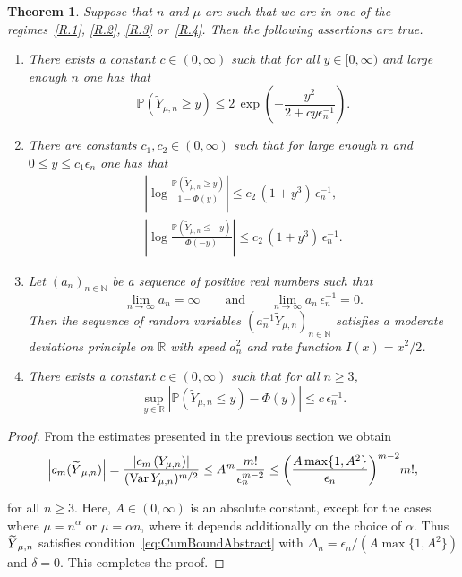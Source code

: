 \documentclass[10pt]{amsart}
\newtheorem{theo}{Theorem}[section]
\theoremstyle{definition}\newtheorem{defi}[theo]{Definition}\newtheorem{rema}[theo]{Remark}\newtheorem{exam}[theo]{Example}\newtheorem{exem}[theo]{Example}\newtheorem{nota}[theo]{Notation}
\newcommand{\R}{\mathbb{R}}
\newcommand{\N}{\mathbb{N}}
\newcommand{\PP}{\mathbb{P}}
\newcommand{\Var}{\mathop{\mathrm{Var}}\nolimits}
\newcommand*{\romanenumi}{\renewcommand*{\theenumi}{\roman{enumi}}}
\let\oldtilde\tilde
\renewcommand*{\tilde}[1]{\mathchoice{\widetilde{#1}}{\widetilde{#1}}{\oldtilde{#1}}{\oldtilde{#1}}}
\begin{document}
\begin{theo}\label{thm:Main}
Suppose that $n$ and $\mu$ are such that we are in one of the regimes~\eqref{R.1}, \eqref{R.2}, \eqref{R.3} or~\eqref{R.4}. Then the following assertions are true.
\begin{enumerate}\romanenumi
\item\label{list4.4.1} There exists a constant $c\in(0,\infty)$ such that for all $y\in[0,\infty)$ and large enough $n$ one has that
\[
\PP\left(\widetilde{Y}_{\mu,n}\geq y\right) \leq 2\,\exp\left(-\frac{y^2}{2+cy\epsilon_n^{-1}}\right).
\]

\item\label{list4.4.2} There are constants $c_1,c_2\in(0,\infty)$ such that for large enough $n$ and\linebreak$0\leq y\leq c_1\epsilon_n$ one has that
\begin{align*}
\left|\log\frac{\PP\left(\widetilde{Y}_{\mu,n}\geq y\right)}{1-\Phi(y)}\right| \leq c_2\,\left(1+y^3\right)\,\epsilon_n^{-1},\\
\left|\log\frac{\PP\left(\widetilde{Y}_{\mu,n}\leq -y\right)}{\Phi(-y)}\right| \leq c_2\,\left(1+y^3\right)\,\epsilon_n^{-1}.
\end{align*}

\item\label{list4.4.3} Let $(a_n)_{n\in\N}$ be a sequence of positive real numbers such that
\[
\lim_{n\to\infty}a_n=\infty\qquad\text{and}\qquad \lim_{n\to\infty}a_n\,\epsilon_n^{-1} = 0.
\]
Then the sequence of random variables $(a_n^{-1}\widetilde{Y}_{\mu,n})_{n\in\N}$ satisfies a moderate deviations principle on $\R$ with speed $a_n^2$ and rate function $I(x)=x^2/2$.

\item \label{list4.4.4}There exists a constant $c\in(0,\infty)$ such that for all $n\geq 3$,
\[
\sup_{y\in\R}\left|\PP\left(\widetilde{Y}_{\mu,n}\leq y\right)-\Phi(y)\right| \leq c\,\epsilon_n^{-1}.
\]
\end{enumerate}
\end{theo}
\begin{proof}
From the estimates presented in the previous section we obtain
\[
\left|c_m(\tilde Y_{\mu, n})\right|=\frac{\left|c_m\left(Y_{\mu, n}\right)\right|}{(\Var Y_{\mu, n})^{m/2}}\leq A^m\frac{m!}{\epsilon_n^{m-2}}\leq\bigg(\frac{A\max\{1,A^2\}}{\epsilon_n}\bigg)^{m-2}m!,
\]

for all $n\geq 3$. Here, $A\in(0,\infty)$ is an absolute constant, except for the cases where $\mu=n^\alpha$ or $\mu=\alpha n$, where it depends additionally on the choice of $\alpha$. Thus $\tilde Y_{\mu, n}$ satisfies condition~\eqref{eq:CumBoundAbstract} with $\Delta_n=\epsilon_n/(A\max\{1,A^2\})$ and $\delta=0$. This completes the proof.
\end{proof}
\end{document}
